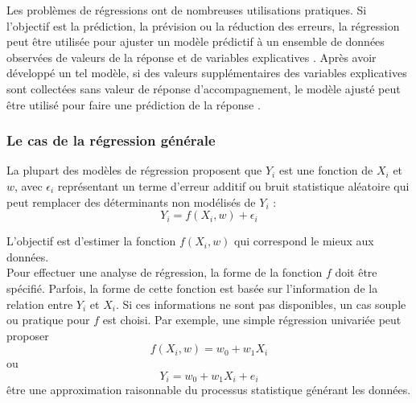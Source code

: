 	
	Les problèmes de régressions ont de nombreuses utilisations pratiques. Si l'objectif est la prédiction, la prévision ou la réduction des erreurs, la régression peut être utilisée pour ajuster un modèle prédictif à un ensemble de données observées de valeurs de la réponse et de variables explicatives \cite{darlington2016regression}. Après avoir développé un tel modèle, si des valeurs supplémentaires des variables explicatives sont collectées sans valeur de réponse d'accompagnement, le modèle ajusté peut être utilisé pour faire une prédiction de la réponse \cite{harrell2001regression}.
	
	
	\subsubsection{Le cas de la régression générale}
	La plupart des modèles de régression proposent que $Y_{i}$ est une fonction de $X_{i}$ et $w$, avec $\epsilon_{i}$ représentant un terme d'erreur additif ou bruit statistique aléatoire qui peut remplacer des déterminants non modélisés de $Y_{i}$ :
	\begin{equation}
	{\displaystyle Y_{i}=f(X_{i},w )+\epsilon_{i}}
	\end{equation}
	
	L'objectif est d'estimer la fonction ${\displaystyle f(X_{i},w )}$ qui correspond le mieux aux données.\\
	Pour effectuer une analyse de régression, la forme de la fonction $f$ doit être spécifié. Parfois, la forme de cette fonction est basée sur l'information de la relation entre $Y_{i}$ et $X_{i}$. 
	Si ces informations ne sont pas disponibles, un cas souple ou pratique pour $f$ est choisi. Par exemple, une simple régression univariée peut proposer
	$${\displaystyle f(X_{i},w )= w_{0}+ w_{1}X_{i}}$$
	ou
	$${\displaystyle Y_{i}= w_{0}+ w_{1}X_{i}+e_{i}}$$
	être une approximation raisonnable du processus statistique générant les données.
	
